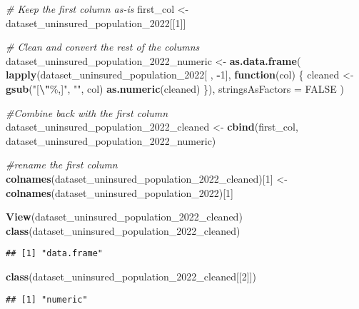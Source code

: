 \documentclass[
]{article}
\newenvironment{Shaded}{\begin{snugshade}}{\end{snugshade}}
\newcommand{\AttributeTok}[1]{\textcolor[rgb]{0.13,0.29,0.53}{#1}}
\newcommand{\CommentTok}[1]{\textcolor[rgb]{0.56,0.35,0.01}{\textit{#1}}}
\newcommand{\ConstantTok}[1]{\textcolor[rgb]{0.56,0.35,0.01}{#1}}
\newcommand{\ControlFlowTok}[1]{\textcolor[rgb]{0.13,0.29,0.53}{\textbf{#1}}}
\newcommand{\DecValTok}[1]{\textcolor[rgb]{0.00,0.00,0.81}{#1}}
\newcommand{\FunctionTok}[1]{\textcolor[rgb]{0.13,0.29,0.53}{\textbf{#1}}}
\newcommand{\NormalTok}[1]{#1}
\newcommand{\OtherTok}[1]{\textcolor[rgb]{0.56,0.35,0.01}{#1}}
\newcommand{\SpecialCharTok}[1]{\textcolor[rgb]{0.81,0.36,0.00}{\textbf{#1}}}
\newcommand{\StringTok}[1]{\textcolor[rgb]{0.31,0.60,0.02}{#1}}
\begin{document}
\begin{Shaded}
\begin{Highlighting}[]
\CommentTok{\# Keep the first column as{-}is}
\NormalTok{first\_col }\OtherTok{\textless{}{-}}\NormalTok{ dataset\_uninsured\_population\_2022[[}\DecValTok{1}\NormalTok{]]}

\CommentTok{\# Clean and convert the rest of the columns}
\NormalTok{dataset\_uninsured\_population\_2022\_numeric }\OtherTok{\textless{}{-}} \FunctionTok{as.data.frame}\NormalTok{(}
  \FunctionTok{lapply}\NormalTok{(dataset\_uninsured\_population\_2022[ , }\SpecialCharTok{{-}}\DecValTok{1}\NormalTok{], }\ControlFlowTok{function}\NormalTok{(col) \{}
\NormalTok{    cleaned }\OtherTok{\textless{}{-}} \FunctionTok{gsub}\NormalTok{(}\StringTok{"[}\SpecialCharTok{\textbackslash{}"}\StringTok{\%,]"}\NormalTok{, }\StringTok{""}\NormalTok{, col)}
    \FunctionTok{as.numeric}\NormalTok{(cleaned)}
\NormalTok{  \}),}
  \AttributeTok{stringsAsFactors =} \ConstantTok{FALSE}
\NormalTok{)}

\CommentTok{\#Combine back with the first column}
\NormalTok{dataset\_uninsured\_population\_2022\_cleaned }\OtherTok{\textless{}{-}} \FunctionTok{cbind}\NormalTok{(first\_col, dataset\_uninsured\_population\_2022\_numeric)}

\CommentTok{\#rename the first column}
\FunctionTok{colnames}\NormalTok{(dataset\_uninsured\_population\_2022\_cleaned)[}\DecValTok{1}\NormalTok{] }\OtherTok{\textless{}{-}} \FunctionTok{colnames}\NormalTok{(dataset\_uninsured\_population\_2022)[}\DecValTok{1}\NormalTok{]}

\FunctionTok{View}\NormalTok{(dataset\_uninsured\_population\_2022\_cleaned)}
\FunctionTok{class}\NormalTok{(dataset\_uninsured\_population\_2022\_cleaned)}
\end{Highlighting}
\end{Shaded}

\begin{verbatim}
## [1] "data.frame"
\end{verbatim}

\begin{Shaded}
\begin{Highlighting}[]
\FunctionTok{class}\NormalTok{(dataset\_uninsured\_population\_2022\_cleaned[[}\DecValTok{2}\NormalTok{]])}
\end{Highlighting}
\end{Shaded}

\begin{verbatim}
## [1] "numeric"
\end{verbatim}
\end{document}
